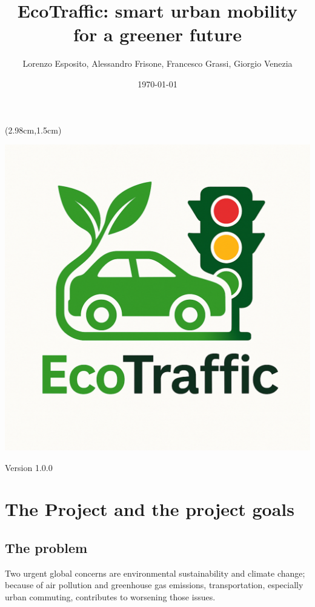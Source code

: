 \documentclass[12pt, a4paper, twoside, openright]{report}
\title{EcoTraffic: smart urban mobility for a greener future}
\author{Lorenzo Esposito, Alessandro Frisone, Francesco Grassi, Giorgio Venezia}
\date{\today}
\begin{document}
\begin{textblock*}{\textwidth}(2.98cm,1.5cm)
  \begin{center}
    \includegraphics[scale=0.25]{images/EcoTraffic_logo.pdf}  
    \maketitle
    Version 1.0.0
  \end{center}  
\end{textblock*}


\blankpage

\tableofcontents
\afterpage{\blankpage}
\newpage
{}

\chapter{The Project and the project goals}
\section{The problem}
Two urgent global concerns are environmental sustainability and climate
change; because of air pollution and greenhouse gas emissions,
transportation, especially urban commuting, contributes to worsening
those issues.
\end{document}
